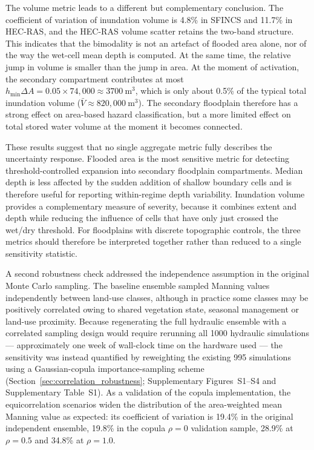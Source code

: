 \documentclass[a4paper,fleqn]{cas-sc}
\newcommand{\sfincs}{\textsc{SFINCS}}
\newcommand{\hecras}{\textsc{HEC-RAS}}
\begin{document}
The volume metric leads to a different but complementary conclusion. The coefficient of variation of inundation volume is 4.8\% in \sfincs{} and 11.7\% in \hecras{}, and the \hecras{} volume scatter retains the two-band structure. This indicates that the bimodality is not an artefact of flooded area alone, nor of the way the wet-cell mean depth is computed. At the same time, the relative jump in volume is smaller than the jump in area. At the moment of activation, the secondary compartment contributes at most $h_{\min}\Delta A = 0.05 \times 74,000 \approx 3700~\mathrm{m^3}$, which is only about 0.5\% of the typical total inundation volume ($\bar{V}\approx 820,000~\mathrm{m^3}$). The secondary floodplain therefore has a strong effect on area-based hazard classification, but a more limited effect on total stored water volume at the moment it becomes connected.

These results suggest that no single aggregate metric fully describes the uncertainty response. Flooded area is the most sensitive metric for detecting threshold-controlled expansion into secondary floodplain compartments. Median depth is less affected by the sudden addition of shallow boundary cells and is therefore useful for reporting within-regime depth variability. Inundation volume provides a complementary measure of severity, because it combines extent and depth while reducing the influence of cells that have only just crossed the wet/dry threshold. For floodplains with discrete topographic controls, the three metrics should therefore be interpreted together rather than reduced to a single sensitivity statistic.

A second robustness check addressed the independence assumption in the original Monte Carlo sampling. The baseline ensemble sampled Manning values independently between land-use classes, although in practice some classes may be positively correlated owing to shared vegetation state, seasonal management or land-use proximity. Because regenerating the full hydraulic ensemble with a correlated sampling design would require rerunning all \num{1000} hydraulic simulations --- approximately one week of wall-clock time on the hardware used --- the sensitivity was instead quantified by reweighting the existing \num{995} simulations using a Gaussian-copula importance-sampling scheme (Section~\ref{sec:correlation_robustness}; Supplementary Figures~S1--S4 and Supplementary Table~S1). As a validation of the copula implementation, the equicorrelation scenarios widen the distribution of the area-weighted mean Manning value as expected: its coefficient of variation is 19.4\% in the original independent ensemble, 19.8\% in the copula $\rho=0$ validation sample, 28.9\% at $\rho=0.5$ and 34.8\% at $\rho=1.0$.
\end{document}
